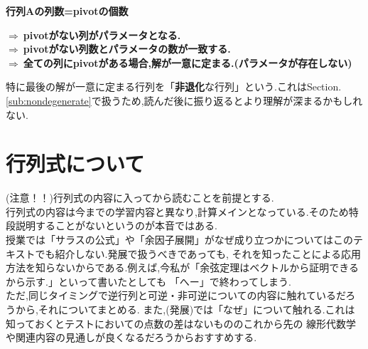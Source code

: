 \begin{tcolorbox}[colframe=black!80,colback=white,title= パラメータの存在条件]
\begin{center}
   \textbf{行列Aの列数=pivotの個数}
\end{center}
    \hspace{1cm}$\Longrightarrow\:$\textbf{pivotがない列がパラメータとなる.}\\
    \hspace{1cm}$\Longrightarrow\:$\textbf{pivotがない列数とパラメータの数が一致する.}\\
    \hspace{1cm}$\Longrightarrow\:$\textbf{全ての列にpivotがある場合,解が一意に定まる.(パラメータが存在しない)}
\end{tcolorbox}
特に最後の解が一意に定まる行列を「\textbf{非退化}な行列」という.これはSection.\ref{sub:nondegenerate}で扱うため,読んだ後に振り返るとより理解が深まるかもしれない.
\section{行列式について}\label{sec:det}
(注意！！)行列式の内容に入ってから読むことを前提とする.\\
行列式の内容は今までの学習内容と異なり,計算メインとなっている.そのため特段説明することがないというのが本音ではある.\\
授業では「サラスの公式」や「余因子展開」がなぜ成り立つかについてはこのテキストでも紹介しない.発展で扱うべきであっても,
それを知ったことによる応用方法を知らないからである.例えば,今私が「余弦定理はベクトルから証明できるから示す.」といって書いたとしても
「へー」で終わってしまう.\\
ただ,同じタイミングで逆行列と可逆・非可逆についての内容に触れているだろうから,それについてまとめる.
また,(発展)では「なぜ」について触れる.これは知っておくとテストにおいての点数の差はないもののこれから先の
線形代数学や関連内容の見通しが良くなるだろうからおすすめする.
